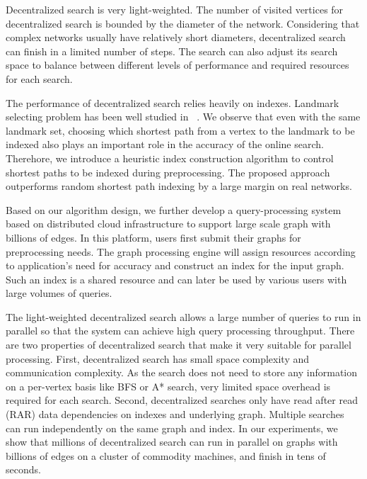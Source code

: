 Decentralized search is very light-weighted. The number of visited vertices for decentralized search is bounded by the diameter of the network. Considering that complex networks usually have relatively short diameters, decentralized search can finish in a limited number of steps. The search can also adjust its search space to balance between different levels of performance and required resources for each search. %

The performance of decentralized search relies heavily on indexes. Landmark selecting problem has been well studied in ~\cite{Potamias:2009:FSP:1645953.1646063,6927522}. We observe that even with the same landmark set, choosing which shortest path from a vertex to the landmark to be indexed also plays an important role in the accuracy of the online search. %
Therehore, we introduce a heuristic index construction algorithm to control shortest paths to be indexed during preprocessing. The proposed approach outperforms random shortest path indexing by a large margin on real networks.

Based on our algorithm design, we further develop a query-processing system based on distributed cloud infrastructure to support large scale graph with billions of edges. In this platform, users first submit their graphs for preprocessing needs. The graph processing engine will assign resources according to application's need for accuracy and construct an index for the input graph. Such an index is a shared resource and can later be used by various users with large volumes of queries.

The light-weighted decentralized search allows a large number of queries to run in parallel so that the system can achieve high query processing throughput. There are two properties of decentralized search that make it very suitable for parallel processing. First, decentralized search has small space complexity and communication complexity. As the search does not need to store any information on a per-vertex basis like BFS or A* search, very limited space overhead is required for each search. Second, decentralized searches only have read after read (RAR) data dependencies on indexes and underlying graph. Multiple searches can run independently on the same graph and index. 
In our experiments, we show that millions of decentralized search can run in parallel on graphs with billions of edges on a cluster of commodity machines, and finish in tens of seconds.


